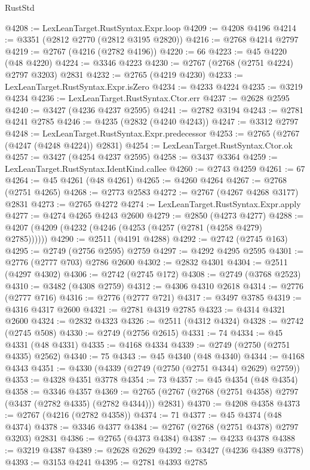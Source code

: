 \begin{lexlean}{RustStd}
\begin{coremodule}
@4208 := LexLeanTarget.RustSyntax.Expr.loop
@4209 := @4208 @4196
@4214 := @3351 (@2812 @2770 (@2812 @3195 @2820))
@4216 := @2768 @4214 @2797
@4219 := @2767 (@4216 (@2782 @4196))
@4220 := 66
@4223 := @45 @4220 (@48 @4220)
@4224 := @3346 @4223
@4230 := @2767 (@2768 (@2751 @4224) @2797 @3203) @2831
@4232 := @2765 (@4219 @4230)
@4233 := LexLeanTarget.RustSyntax.Expr.isZero
@4234 := @4233 @4224
@4235 := @3219 @4234
@4236 := LexLeanTarget.RustSyntax.Ctor.err
@4237 := @2628 @2595
@4240 := @3427 (@4236 @4237 @2595)
@4241 := @2782 @3194
@4243 := @2781 @4241 @2785
@4246 := @4235 (@2832 (@4240 @4243))
@4247 := @3312 @2797
@4248 := LexLeanTarget.RustSyntax.Expr.predecessor
@4253 := @2765 (@2767 (@4247 (@4248 @4224)) @2831)
@4254 := LexLeanTarget.RustSyntax.Ctor.ok
@4257 := @3427 (@4254 @4237 @2595)
@4258 := @3437 @3364
@4259 := LexLeanTarget.RustSyntax.IdentKind.callee
@4260 := @2743 @4259
@4261 := 67
@4264 := @45 @4261 (@48 @4261)
@4265 := @4260 @4264
@4267 := @2768 (@2751 @4265)
@4268 := @2773 @2583
@4272 := @2767 (@4267 @4268 @3177) @2831
@4273 := @2765 @4272
@4274 := LexLeanTarget.RustSyntax.Expr.apply
@4277 := @4274 @4265 @4243 @2600
@4279 := @2850 (@4273 @4277)
@4288 := @4207 (@4209 (@4232 (@4246 (@4253 (@4257 (@2781 (@4258 @4279) @2785))))))
@4290 := @2511 (@4191 @4288)
@4292 := @2742 (@2745 @163)
@4295 := @2749 (@2756 @2595) @2759
@4297 := @4292 @4295 @2595
@4301 := @2776 (@2777 @703) @2786 @2600
@4302 := @2832 @4301
@4304 := @2511 (@4297 @4302)
@4306 := @2742 (@2745 @172)
@4308 := @2749 (@3768 @2523)
@4310 := @3482 (@4308 @2759)
@4312 := @4306 @4310 @2618
@4314 := @2776 (@2777 @716)
@4316 := @2776 (@2777 @721)
@4317 := @3497 @3785
@4319 := @4316 @4317 @2600
@4321 := @2781 @4319 @2785
@4323 := @4314 @4321 @2600
@4324 := @2832 @4323
@4326 := @2511 (@4312 @4324)
@4328 := @2742 (@2745 @508)
@4330 := @2749 (@2756 @2615)
@4331 := 74
@4334 := @45 @4331 (@48 @4331)
@4335 := @4168 @4334
@4339 := @2749 (@2750 (@2751 @4335) @2562)
@4340 := 75
@4343 := @45 @4340 (@48 @4340)
@4344 := @4168 @4343
@4351 := @4330 (@4339 (@2749 (@2750 (@2751 @4344) @2629) @2759))
@4353 := @4328 @4351 @3778
@4354 := 73
@4357 := @45 @4354 (@48 @4354)
@4358 := @3346 @4357
@4369 := @2765 (@2767 (@2768 (@2751 @4358) @2797 (@3437 (@2782 @4335) (@2782 @4344))) @2831)
@4370 := @4208 @4358
@4373 := @2767 (@4216 (@2782 @4358))
@4374 := 71
@4377 := @45 @4374 (@48 @4374)
@4378 := @3346 @4377
@4384 := @2767 (@2768 (@2751 @4378) @2797 @3203) @2831
@4386 := @2765 (@4373 @4384)
@4387 := @4233 @4378
@4388 := @3219 @4387
@4389 := @2628 @2629
@4392 := @3427 (@4236 @4389 @3778)
@4393 := @3153 @4241
@4395 := @2781 @4393 @2785

\end{coremodule}
\end{lexlean}
